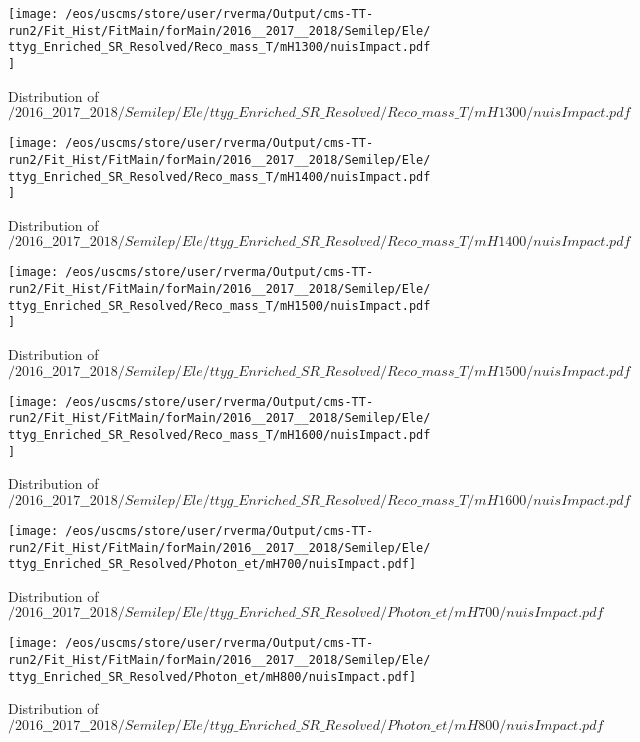\begin{figure}
\centering
\texttt{[image: /eos/uscms/store/user/rverma/Output/cms-TT-run2/Fit\_Hist/FitMain/forMain/2016\_\_2017\_\_2018/Semilep/Ele/ttyg\_Enriched\_SR\_Resolved/Reco\_mass\_T/mH1300/nuisImpact.pdf]}
\caption{Distribution of $/2016\_\_2017\_\_2018/Semilep/Ele/ttyg\_Enriched\_SR\_Resolved/Reco\_mass\_T/mH1300/nuisImpact.pdf$}
\end{figure}

\begin{figure}
\centering
\texttt{[image: /eos/uscms/store/user/rverma/Output/cms-TT-run2/Fit\_Hist/FitMain/forMain/2016\_\_2017\_\_2018/Semilep/Ele/ttyg\_Enriched\_SR\_Resolved/Reco\_mass\_T/mH1400/nuisImpact.pdf]}
\caption{Distribution of $/2016\_\_2017\_\_2018/Semilep/Ele/ttyg\_Enriched\_SR\_Resolved/Reco\_mass\_T/mH1400/nuisImpact.pdf$}
\end{figure}

\begin{figure}
\centering
\texttt{[image: /eos/uscms/store/user/rverma/Output/cms-TT-run2/Fit\_Hist/FitMain/forMain/2016\_\_2017\_\_2018/Semilep/Ele/ttyg\_Enriched\_SR\_Resolved/Reco\_mass\_T/mH1500/nuisImpact.pdf]}
\caption{Distribution of $/2016\_\_2017\_\_2018/Semilep/Ele/ttyg\_Enriched\_SR\_Resolved/Reco\_mass\_T/mH1500/nuisImpact.pdf$}
\end{figure}

\begin{figure}
\centering
\texttt{[image: /eos/uscms/store/user/rverma/Output/cms-TT-run2/Fit\_Hist/FitMain/forMain/2016\_\_2017\_\_2018/Semilep/Ele/ttyg\_Enriched\_SR\_Resolved/Reco\_mass\_T/mH1600/nuisImpact.pdf]}
\caption{Distribution of $/2016\_\_2017\_\_2018/Semilep/Ele/ttyg\_Enriched\_SR\_Resolved/Reco\_mass\_T/mH1600/nuisImpact.pdf$}
\end{figure}

\begin{figure}
\centering
\texttt{[image: /eos/uscms/store/user/rverma/Output/cms-TT-run2/Fit\_Hist/FitMain/forMain/2016\_\_2017\_\_2018/Semilep/Ele/ttyg\_Enriched\_SR\_Resolved/Photon\_et/mH700/nuisImpact.pdf]}
\caption{Distribution of $/2016\_\_2017\_\_2018/Semilep/Ele/ttyg\_Enriched\_SR\_Resolved/Photon\_et/mH700/nuisImpact.pdf$}
\end{figure}

\begin{figure}
\centering
\texttt{[image: /eos/uscms/store/user/rverma/Output/cms-TT-run2/Fit\_Hist/FitMain/forMain/2016\_\_2017\_\_2018/Semilep/Ele/ttyg\_Enriched\_SR\_Resolved/Photon\_et/mH800/nuisImpact.pdf]}
\caption{Distribution of $/2016\_\_2017\_\_2018/Semilep/Ele/ttyg\_Enriched\_SR\_Resolved/Photon\_et/mH800/nuisImpact.pdf$}
\end{figure}

